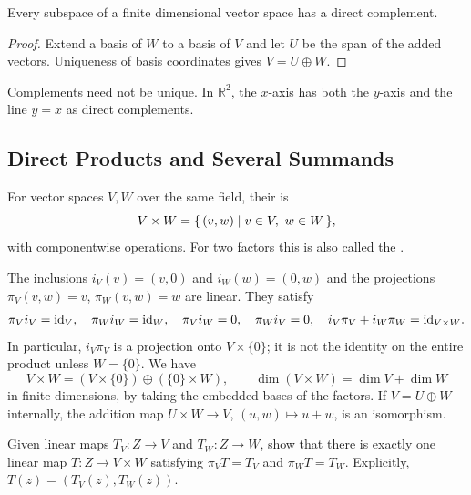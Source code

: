\begin{Corollary}
Every subspace of a finite dimensional vector space has a direct complement.
\end{Corollary}
\begin{proof}
Extend a basis of $W$ to a basis of $V$ and let $U$ be the span of the added vectors. Uniqueness of basis coordinates gives $V=U\oplus W$.
\end{proof}

\begin{Remark*}
Complements need not be unique. In $\mathbb R^2$, the $x$-axis has both the $y$-axis and the line $y=x$ as direct complements.
\end{Remark*}

\subsection{Direct Products and Several Summands}

\begin{Definition}
For vector spaces $V,W$ over the same field, their  is
\begin{equation*}
V\times W=\qty{\, (v,w) \mid v\in V,\ w\in W \,},
\end{equation*}
with componentwise operations. For two factors this is also called the .
\end{Definition}

The inclusions $i_V(v)=(v,0)$ and $i_W(w)=(0,w)$ and the projections $\pi_V(v,w)=v$, $\pi_W(v,w)=w$ are linear. They satisfy
\begin{equation*}
\pi_Vi_V=\mathrm{id}_V,\quad \pi_Wi_W=\mathrm{id}_W,\quad \pi_Vi_W=0,\quad \pi_Wi_V=0,\quad i_V\pi_V+i_W\pi_W=\mathrm{id}_{V\times W}.
\end{equation*}
In particular, $i_V\pi_V$ is a projection onto $V\times\{0\}$; it is not the identity on the entire product unless $W=\{0\}$. We have
\begin{equation*}
V\times W=(V\times\{0\})\oplus(\{0\}\times W),\qquad \dim(V\times W)=\dim V+\dim W
\end{equation*}
in finite dimensions, by taking the embedded bases of the factors. If $V=U\oplus W$ internally, the addition map $U\times W\to V$, $(u,w)\mapsto u+w$, is an isomorphism.

\begin{Exercise}
Given linear maps $T_V\colon Z\to V$ and $T_W\colon Z\to W$, show that there is exactly one linear map $T\colon Z\to V\times W$ satisfying $\pi_VT=T_V$ and $\pi_WT=T_W$. Explicitly, $T(z)=(T_V(z),T_W(z))$.
\end{Exercise}

